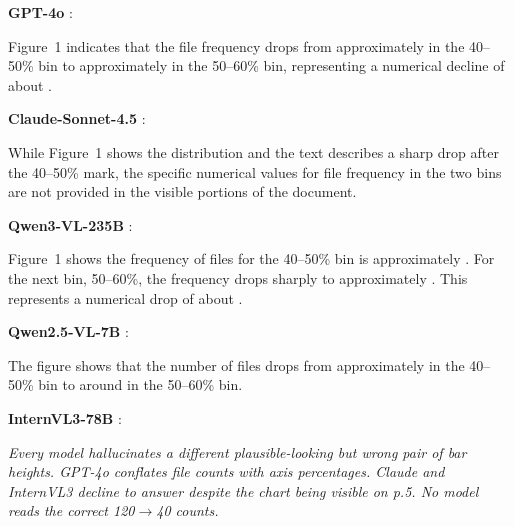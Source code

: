 \documentclass{article} %
\begin{document}
\noindent\textbf{GPT-4o} :
\begin{tcolorbox}[enhanced,breakable,colback=red!5,colframe=red!30,boxrule=0.4pt,arc=2pt,left=6pt,right=6pt,top=2pt,bottom=2pt]
\footnotesize
Figure~1 indicates that the file frequency drops from approximately  in the
40--50\% bin to approximately  in the 50--60\% bin, representing a numerical
decline of about .
\end{tcolorbox}

\noindent\textbf{Claude-Sonnet-4.5} :
\begin{tcolorbox}[enhanced,breakable,colback=red!5,colframe=red!30,boxrule=0.4pt,arc=2pt,left=6pt,right=6pt,top=2pt,bottom=2pt]
\footnotesize
{} While Figure~1 shows the distribution and the text
describes a sharp drop after the 40--50\% mark, the specific numerical values for
file frequency in the two bins are not provided in the visible portions of the document.
\end{tcolorbox}

\noindent\textbf{Qwen3-VL-235B} :
\begin{tcolorbox}[enhanced,breakable,colback=red!5,colframe=red!30,boxrule=0.4pt,arc=2pt,left=6pt,right=6pt,top=2pt,bottom=2pt]
\footnotesize
Figure~1 shows the frequency of files for the 40--50\% bin is approximately
. For the next bin, 50--60\%, the frequency drops sharply to approximately
. This represents a numerical drop of about .
\end{tcolorbox}

\noindent\textbf{Qwen2.5-VL-7B} :
\begin{tcolorbox}[enhanced,breakable,colback=red!5,colframe=red!30,boxrule=0.4pt,arc=2pt,left=6pt,right=6pt,top=2pt,bottom=2pt]
\footnotesize
The figure shows that the number of files drops from approximately  in the
40--50\% bin to around  in the 50--60\% bin.
\end{tcolorbox}

\noindent\textbf{InternVL3-78B} :
\begin{tcolorbox}[enhanced,breakable,colback=red!5,colframe=red!30,boxrule=0.4pt,arc=2pt,left=6pt,right=6pt,top=2pt,bottom=2pt]
\footnotesize
{}
\end{tcolorbox}

\noindent\textit{Every model hallucinates a different plausible-looking but wrong pair of bar heights. GPT-4o conflates file counts with axis percentages. Claude and InternVL3 decline to answer despite the chart being visible on p.5. No model reads the correct 120$\to$40 counts.}
\end{document}
